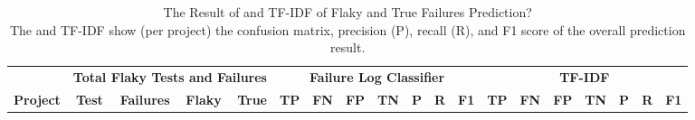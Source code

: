 \begin{table*}[t]
\caption[The Prediction of \classifier and TF-IDF of Flaky and True Failures]{The Result of \classifier and TF-IDF of Flaky and True Failures Prediction?\\
\textnormal{The \classifier and TF-IDF show (per project) the confusion matrix, precision (P), recall (R), and F1 score of the overall prediction result. 
}}
\label{table:classifier_table}
\vspace{-5pt}
\setlength{\tabcolsep}{1.0pt}
\newcommand{\failureRateWidth}{2.5in}
\newcommand{\failureRateHeight}{4em}
\scriptsize
\centering
    \begin{tabular}{l|rrrr|rrrrrrr|rrrrrrr}
    \toprule
      & \multicolumn{4}{c}{\textbf{Total Flaky Tests and Failures}} & \multicolumn{7}{c}{\textbf{Failure Log Classifier}} & \multicolumn{7}{c}{\textbf{TF-IDF}}\\ 
     
     \textbf{Project}&\textbf{Test}&\textbf{Failures}&\textbf{Flaky}&\textbf{True}&\textbf{TP}&\textbf{FN}&\textbf{FP}&\textbf{TN}&\textbf{P}&\textbf{R}&\textbf{F1}&\textbf{TP}&\textbf{FN}&\textbf{FP}&\textbf{TN}&\textbf{P}&\textbf{R}&\textbf{F1}\\
        \midrule


\end{tabular}
\end{table*}

